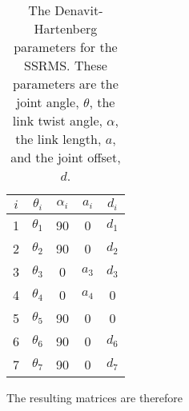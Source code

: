 \documentclass[onecolumn,10pt]{jhwhw}
\begin{document}
\begin{table}[h]
\centering
\begin{tabular}{c|*{4}{c}}
\toprule
$i$ & $\theta_i$ & $\alpha_i$ & $a_i$ & $d_i$ \\
\midrule
1 & $\theta_1$ & 90 &     0 & $d_1$ \\
2 & $\theta_2$ & 90 &     0 & $d_2$ \\
3 & $\theta_3$ &  0 & $a_3$ & $d_3$ \\
4 & $\theta_4$ &  0 & $a_4$ &     0 \\
5 & $\theta_5$ & 90 &     0 &     0 \\
6 & $\theta_6$ & 90 &     0 & $d_6$ \\
7 & $\theta_7$ & 90 &     0 & $d_7$ \\
\bottomrule
\end{tabular}
\caption{The Denavit-Hartenberg parameters for the SSRMS. These parameters are the joint angle, $\theta$, the link twist angle, $\alpha$, the link length, $a$, and the joint offset, $d$.}
\end{table}
The resulting matrices are therefore
\end{document}
